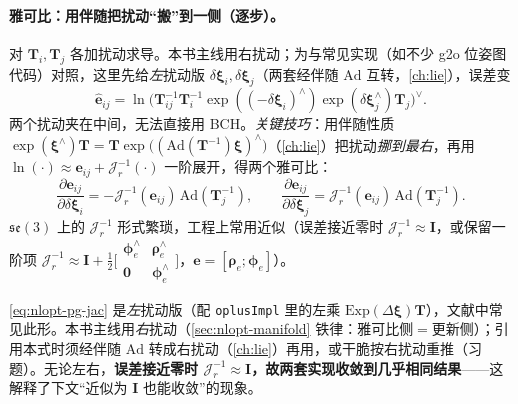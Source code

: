 \paragraph{雅可比：用伴随把扰动“搬”到一侧（逐步）。}\cite{gaoxiang2019slam14}
对 $\mathbf{T}_i,\mathbf{T}_j$ 各加扰动求导。本书主线用右扰动；为与常见实现（如不少 g2o 位姿图代码）对照，这里先给\emph{左}扰动版 $\delta\boldsymbol{\xi}_i,\delta\boldsymbol{\xi}_j$（两套经伴随 $\mathrm{Ad}$ 互转，\cref{ch:lie}），误差变
\begin{equation}
  \hat{\mathbf{e}}_{ij}=\ln\!\big(\mathbf{T}_{ij}^{-1}\mathbf{T}_i^{-1}\exp((-\delta\boldsymbol{\xi}_i)^\wedge)\exp(\delta\boldsymbol{\xi}_j^\wedge)\mathbf{T}_j\big)^\vee.
  \label{eq:nlopt-pg-pert}
\end{equation}
两个扰动夹在中间，无法直接用 BCH。\emph{关键技巧}：用伴随性质 $\exp(\boldsymbol{\xi}^\wedge)\mathbf{T}=\mathbf{T}\exp\big((\mathrm{Ad}(\mathbf{T}^{-1})\boldsymbol{\xi})^\wedge\big)$（\cref{ch:lie}）把扰动\emph{挪到最右}，再用 $\ln(\cdot)\approx\mathbf{e}_{ij}+\boldsymbol{\mathcal{J}}_r^{-1}(\cdot)$ 一阶展开，得两个雅可比：
\begin{equation}
  \frac{\partial\mathbf{e}_{ij}}{\partial\delta\boldsymbol{\xi}_i}=-\boldsymbol{\mathcal{J}}_r^{-1}(\mathbf{e}_{ij})\,\mathrm{Ad}(\mathbf{T}_j^{-1}),\qquad
  \frac{\partial\mathbf{e}_{ij}}{\partial\delta\boldsymbol{\xi}_j}=\boldsymbol{\mathcal{J}}_r^{-1}(\mathbf{e}_{ij})\,\mathrm{Ad}(\mathbf{T}_j^{-1}).
  \label{eq:nlopt-pg-jac}
\end{equation}
$\mathfrak{se}(3)$ 上的 $\boldsymbol{\mathcal{J}}_r^{-1}$ 形式繁琐，工程上常用近似（误差接近零时 $\boldsymbol{\mathcal{J}}_r^{-1}\approx\mathbf{I}$，或保留一阶项 $\boldsymbol{\mathcal{J}}_r^{-1}\approx\mathbf{I}+\tfrac12\big[\begin{smallmatrix}\boldsymbol{\phi}_e^\wedge&\boldsymbol{\rho}_e^\wedge\\\mathbf{0}&\boldsymbol{\phi}_e^\wedge\end{smallmatrix}\big]$，$\mathbf{e}=[\boldsymbol{\rho}_e;\boldsymbol{\phi}_e]$）。

\begin{insight}
\cref{eq:nlopt-pg-jac} 是\emph{左}扰动版（配 \texttt{oplusImpl} 里的左乘 $\mathrm{Exp}(\Delta\boldsymbol{\xi})\mathbf{T}$），文献中常见此形\cite{gaoxiang2019slam14}。本书主线用\emph{右}扰动（\cref{sec:nlopt-manifold} 铁律：雅可比侧$=$更新侧）；引用本式时须经伴随 $\mathrm{Ad}$ 转成右扰动（\cref{ch:lie}）再用，或干脆按右扰动重推（习题）。无论左右，\textbf{误差接近零时 $\boldsymbol{\mathcal{J}}_r^{-1}\approx\mathbf{I}$，故两套实现收敛到几乎相同结果}——这解释了下文“近似为 $\mathbf{I}$ 也能收敛”的现象。
\end{insight}

